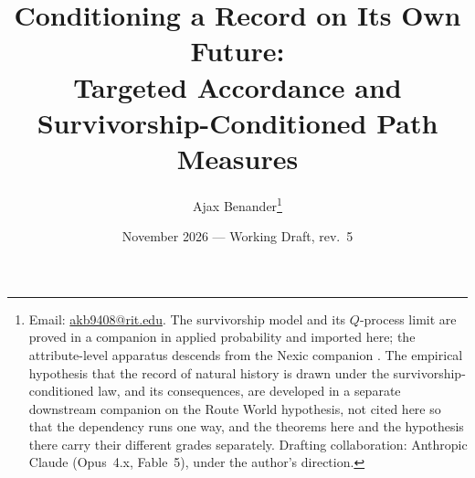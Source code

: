 
\renewcommand*{\bibfont}{\small}
\newcommand{\E}{\mathbb{E}}
\newcommand{\PP}{\mathbb{P}}
\newcommand{\R}{\mathbb{R}}
\newcommand{\one}{\mathbf{1}}
\newcommand{\Fc}{\mathcal{F}}
\newcommand{\hm}{\mathfrak{h}}
\DeclareMathOperator{\KL}{D_{\mathrm{KL}}}
\theoremstyle{plain}
\newtheorem{theorem}{Theorem}[section]
\newtheorem{proposition}[theorem]{Proposition}
\newtheorem{lemma}[theorem]{Lemma}
\newtheorem{corollary}[theorem]{Corollary}
\theoremstyle{definition}
\newtheorem{definition}[theorem]{Definition}
\newtheorem{hypothesis}[theorem]{Hypothesis}
\theoremstyle{remark}
\newtheorem{remark}[theorem]{Remark}
\title{Conditioning a Record on Its Own Future:\\ \large Targeted Accordance and Survivorship-Conditioned Path Measures}
\author{Ajax Benander\thanks{Email:
\href{mailto:akb9408@rit.edu}{akb9408@rit.edu}. The survivorship model and
its $Q$-process limit are proved in a companion in applied probability
\cite{GoldenSurvivorship} and imported here; the attribute-level apparatus descends from
the Nexic companion \cite{Nexus}. The empirical hypothesis that the record of
natural history is drawn under the survivorship-conditioned law, and its
consequences, are developed in a separate downstream companion on the
Route World hypothesis, not cited here so that the dependency runs one
way, and the theorems here and the hypothesis there carry their
different grades separately. Drafting collaboration: Anthropic Claude (Opus~4.x,
Fable~5), under the author's direction.}}
\date{November 2026 --- Working Draft, rev.~5}

\maketitle

